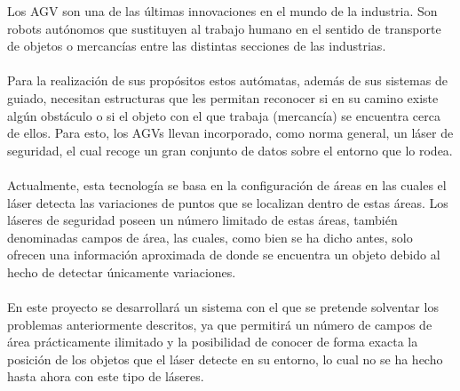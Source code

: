 
Los AGV \cite{AGVdes} son una de las últimas innovaciones en el mundo de la industria. Son robots autónomos que sustituyen al trabajo humano en el sentido de transporte de objetos o mercancías entre las distintas secciones de las industrias. \\
\\
Para la realización de sus propósitos estos autómatas, además de sus sistemas de guiado, necesitan estructuras que les permitan reconocer si en su camino existe algún obstáculo o si el objeto con el que trabaja (mercancía) se encuentra cerca de ellos. Para esto, los AGVs llevan incorporado, como norma general, un láser de seguridad, el cual recoge un gran conjunto de datos sobre el entorno que lo rodea.\\
\\
Actualmente, esta tecnología se basa en la configuración de áreas en las cuales el láser detecta las variaciones de puntos que se localizan dentro de estas áreas. Los láseres de seguridad poseen un número limitado de estas áreas, también denominadas campos de área, las cuales, como bien se ha dicho antes, solo ofrecen una información aproximada de donde se encuentra un objeto debido al hecho de detectar únicamente variaciones.\\
\\
En este proyecto se desarrollará un sistema con el que se pretende solventar los problemas anteriormente descritos, ya que permitirá un número de campos de área prácticamente ilimitado y la posibilidad de conocer de forma exacta la posición de los objetos que el láser detecte en su entorno, lo cual no se ha hecho hasta ahora con este tipo de láseres.\\
\\
